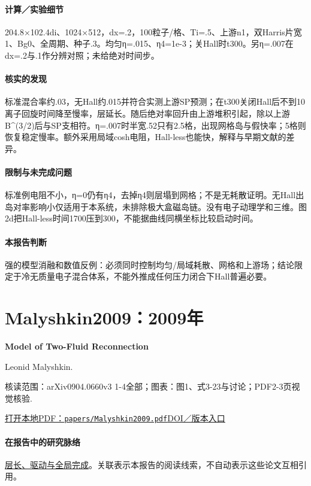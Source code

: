 \paragraph{计算／实验细节}204.8×102.4di、1024×512，dx=.2，100粒子/格、Ti=.5、上游n1，双Harris片宽1、Bg0、全周期、种子.3。均匀η=.015、η4=1e-3；关Hall时t300。另η=.007在dx=.2与.1作分辨对照；未给绝对时间步。

\paragraph{核实的发现}标准混合率约.03，无Hall约.015并符合实测上游SP预测；在t300关闭Hall后不到10离子回旋时间降至慢率，层延长。随后绝对率回升由上游堆积引起，除以上游B\textasciicircum{}(3/2)后与SP支相符。η=.007时半宽.52只有2.5格，出现网格岛与假快率；5格则恢复稳定慢率。额外采用局域cosh电阻，Hall-less也能快，解释与早期文献的差异。

\paragraph{限制与未完成问题}标准例电阻不小，η=0仍有η4，去掉η4则层塌到网格；不是无耗散证明。无Hall出岛对率影响小仅适用于本系统，未排除极大盒磁岛链。没有电子动理学和三维。图2d把Hall-less时间1700压到300，不能据曲线同横坐标比较启动时间。

\paragraph{本报告判断}强的模型消融和数值反例：必须同时控制均匀/局域耗散、网格和上游场；结论限定于冷无质量电子混合体系，不能外推成任何压力闭合下Hall普遍必要。

\section{Malyshkin2009：2009年}\label{paper:Malyshkin2009}

\textbf{Model of Two-Fluid Reconnection}\citep{Malyshkin2009}\

Leonid Malyshkin.

\textsf{核读范围：}arXiv0904.0660v3 1-4全部；\textsf{图表：}图1、式3-23与讨论；PDF2-3页视觉核验.

\href{run:papers/Malyshkin2009.pdf}{打开本地PDF：\texttt{papers/Malyshkin2009.pdf}}\quad\href{https://doi.org/10.1103/physrevlett.103.235004}{DOI／版本入口}

\paragraph{在报告中的研究脉络}\hyperref[story:global]{层长、驱动与全局完成}。关联表示本报告的阅读线索，不自动表示这些论文互相引用。

